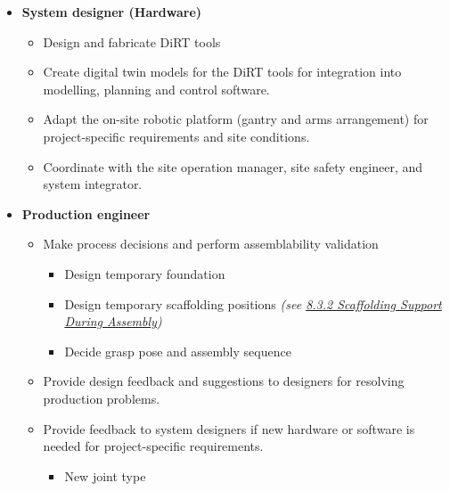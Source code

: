 \begin{itemize}
\begin{itemize}
	\end{itemize}
	\item \textbf{System designer (Hardware)}

	\begin{itemize}
		\item Design and fabricate DiRT tools

		\item Create digital twin models for the DiRT tools for integration into modelling, planning and control software. 

		\item Adapt the on-site robotic platform (gantry and arms arrangement) for project-specific requirements and site conditions. 

		\item Coordinate with the site operation manager, site safety engineer, and system integrator.

	\end{itemize}
	\item \textbf{Production engineer}

	\begin{itemize}
		\item Make process decisions and perform assemblability validation

		\begin{itemize}
			\item Design temporary foundation 

			\item Design temporary scaffolding positions \textit{(see \ul{8.3.2 Scaffolding Support During Assembly})}

			\item Decide grasp pose and assembly sequence 

		\end{itemize}
		\item Provide design feedback and suggestions to designers for resolving production problems.

		\item Provide feedback to system designers if new hardware or software is needed for project-specific requirements.

		\begin{itemize}
			\item New joint type 


\end{itemize}
\end{itemize}
\end{itemize}
